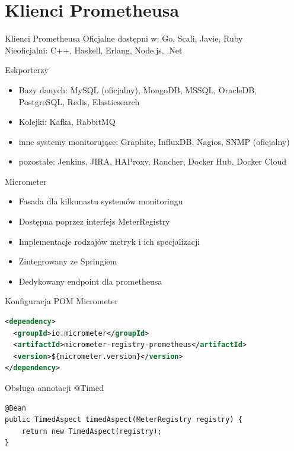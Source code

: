 \documentclass[epic,eepic,aspectratio=169,12pt]{beamer}
\begin{document}
\section{Klienci Prometheusa}
\begin{frame}{Klienci Prometheusa}
	Oficjalne dostępni w: Go, Scali, Javie, Ruby\\
	Nieoficjalni: C++, Haskell, Erlang, Node.js, .Net		
\end{frame}
\begin{frame}{Eskporterzy}
	\begin{itemize}
		\item Bazy danych: MySQL (oficjalny), MongoDB, MSSQL, OracleDB, PostgreSQL, Redis, Elasticsearch
		\item Kolejki: Kafka, RabbitMQ 
		\item inne systemy monitorujące: Graphite, InfluxDB, Nagios, SNMP (oficjalny)
		\item pozostałe: Jenkins, JIRA,  HAProxy, Rancher, Docker Hub, Docker Cloud 
	\end{itemize}
\end{frame}
\begin{frame}{Micrometer}	
	\begin{itemize}
		\item Fasada dla kilkunastu systemów monitoringu
		\item Dostępna poprzez interfejs MeterRegistry
		\item Implementacje rodzajów metryk i ich specjalizacji
		\item Zintegrowany ze Springiem
		\item Dedykowany endpoint dla prometheusa
	\end{itemize}
\end{frame}
\begin{frame}[fragile]{Konfiguracja POM Micrometer}
	\begin{lstlisting}[language=XML]
<dependency>
  <groupId>io.micrometer</groupId>
  <artifactId>micrometer-registry-prometheus</artifactId>
  <version>${micrometer.version}</version>
</dependency>
	\end{lstlisting}
\end{frame}
\begin{frame}[fragile]{Obsługa annotacji @Timed}
		\begin{lstlisting}
@Bean
public TimedAspect timedAspect(MeterRegistry registry) {
	return new TimedAspect(registry);
}
		\end{lstlisting}
\end{frame}
\end{document}
